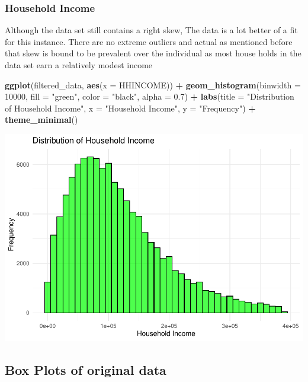 \documentclass[
]{article}
\newenvironment{Shaded}{\begin{snugshade}}{\end{snugshade}}
\newcommand{\AttributeTok}[1]{\textcolor[rgb]{0.13,0.29,0.53}{#1}}
\newcommand{\DecValTok}[1]{\textcolor[rgb]{0.00,0.00,0.81}{#1}}
\newcommand{\FloatTok}[1]{\textcolor[rgb]{0.00,0.00,0.81}{#1}}
\newcommand{\FunctionTok}[1]{\textcolor[rgb]{0.13,0.29,0.53}{\textbf{#1}}}
\newcommand{\NormalTok}[1]{#1}
\newcommand{\SpecialCharTok}[1]{\textcolor[rgb]{0.81,0.36,0.00}{\textbf{#1}}}
\newcommand{\StringTok}[1]{\textcolor[rgb]{0.31,0.60,0.02}{#1}}
\begin{document}
\subsubsection{Household Income}\label{household-income-1}

Although the data set still contains a right skew, The data is a lot
better of a fit for this instance. There are no extreme outliers and
actual as mentioned before that skew is bound to be prevalent over the
individual as most house holds in the data set earn a relatively modest
income

\begin{Shaded}
\begin{Highlighting}[]
\FunctionTok{ggplot}\NormalTok{(filtered\_data, }\FunctionTok{aes}\NormalTok{(}\AttributeTok{x =}\NormalTok{ HHINCOME)) }\SpecialCharTok{+}
  \FunctionTok{geom\_histogram}\NormalTok{(}\AttributeTok{binwidth =} \DecValTok{10000}\NormalTok{, }\AttributeTok{fill =} \StringTok{"green"}\NormalTok{, }\AttributeTok{color =} \StringTok{"black"}\NormalTok{, }\AttributeTok{alpha =} \FloatTok{0.7}\NormalTok{) }\SpecialCharTok{+}
  \FunctionTok{labs}\NormalTok{(}\AttributeTok{title =} \StringTok{"Distribution of Household Income"}\NormalTok{, }\AttributeTok{x =} \StringTok{"Household Income"}\NormalTok{, }\AttributeTok{y =} \StringTok{"Frequency"}\NormalTok{) }\SpecialCharTok{+}
  \FunctionTok{theme\_minimal}\NormalTok{()}
\end{Highlighting}
\end{Shaded}

\includegraphics{Project_1_456_files/figure-latex/unnamed-chunk-8-1.pdf}

\subsection{Box Plots of original
data}\label{box-plots-of-original-data}
\end{document}
